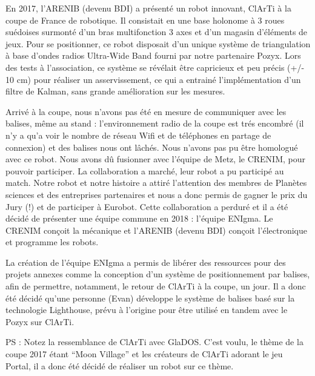 ﻿En 2017, l'ARENIB (devenu BDI) a présenté un robot innovant, ClArTi à la coupe de France de robotique. Il consistait en une base holonome à 3 roues suédoises surmonté d'un bras multifonction 3 axes et d'un magasin d'éléments de jeux. Pour se positionner, ce robot disposait d'un unique système de triangulation à base d'ondes radios Ultra-Wide Band fourni par notre partenaire Pozyx. Lors des tests à l'association, ce système se révélait être capricieux et peu précis (+/- 10 cm) pour réaliser un asservissement, ce qui a entrainé l'implémentation d'un filtre de Kalman, sans grande amélioration sur les mesures.

Arrivé à la coupe, nous n'avons pas été en mesure de communiquer avec les balises, même au stand : l'environnement radio de la coupe est trés encombré (il n'y a qu'a voir le nombre de réseau Wifi et de téléphones en partage de connexion) et des balises nous ont lâchés. Nous n'avons pas pu être homologué avec ce robot. Nous avons dû fusionner avec l'équipe de Metz, le CRENIM, pour pouvoir participer. La collaboration a marché, leur robot a pu participé au match. Notre robot et notre histoire a attiré l'attention des membres de Planètes sciences et des entreprises partenaires et nous a donc permis de gagner le prix du Jury (!) et de participer à Eurobot. Cette collaboration a perduré et il a été décidé de présenter une équipe commune en 2018 : l'équipe ENIgma. Le CRENIM conçoit la mécanique et l'ARENIB (devenu BDI) conçoit l'électronique et programme les robots.

La création de l'équipe ENIgma a permis de libérer des ressources pour des projets annexes comme la conception d'un système de positionnement par balises, afin de permettre, notamment, le retour de ClArTi à la coupe, un jour. Il a donc été décidé qu'une personne (Evan) développe le système de balises basé sur la technologie Lighthouse, prévu à l'origine pour être utilisé en tandem avec le Pozyx sur ClArTi.

PS : Notez la ressemblance de ClArTi avec GlaDOS. C'est voulu, le thème de la coupe 2017 étant "`Moon Village"' et les créateurs de ClArTi adorant le jeu Portal, il a donc été décidé de réaliser un robot sur ce thème.